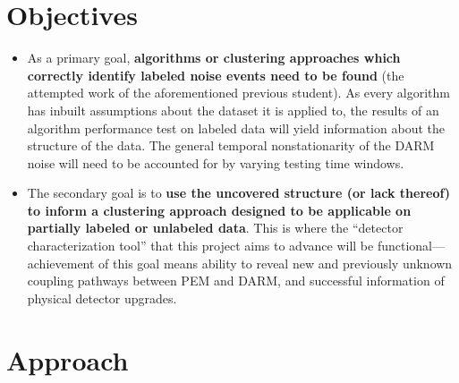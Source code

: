 \documentclass[colorlinks=true,pdfstartview=FitV,linkcolor=blue,
            citecolor=red,urlcolor=magenta]{ligodoc}
\begin{document}
\section{Objectives}
\begin{itemize}
\item
As a primary goal, \textbf{algorithms or clustering approaches which correctly identify labeled noise events need to be found} (the attempted work of the aforementioned previous student).
As every algorithm has inbuilt assumptions about the dataset it is applied to, the results of an algorithm performance test on labeled data will yield information about the structure of the data.
The general temporal nonstationarity of the DARM noise will need to be accounted for by varying testing time windows.
\item
The secondary goal is to \textbf{use the uncovered structure (or lack thereof) to inform a clustering approach designed to be applicable on partially labeled or unlabeled data}.
This is where the ``detector characterization tool'' that this project aims to advance will be functional---achievement of this goal means ability to reveal new and previously unknown coupling pathways between PEM and DARM, and successful information of physical detector upgrades.
\end{itemize}

\section{Approach}
\end{document}
